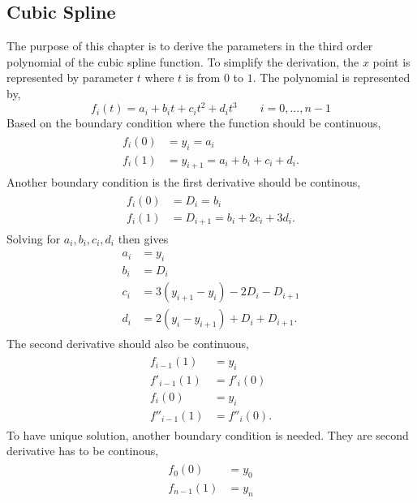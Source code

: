 \begin{appendices}
\chapter{Cubic Spline}
\label{ch:cubicspline}
The purpose of this chapter is to derive the parameters in the third order polynomial of the cubic spline function. To simplify the derivation, the $x$ point is represented by parameter $t$ where $t$ is from $0$ to $1$. The polynomial is represented by,
\begin{equation}
f_{i}(t)=a_i + b_i t +c_i t^2 +d_i t^3 \qquad i=0,...,n-1
\end{equation} 
Based on the boundary condition where the function should be continuous, 
\begin{align}
\begin{split}
f_{i}(0)&=y_i=a_i \\
f_{i}(1)&=y_{i+1}=a_i+b_i+c_i+d_i.
\end{split}
\end{align}
Another boundary condition is the first derivative should be continous,
\begin{align}
\begin{split}
f_{i}(0)&=D_i=b_i \\
f_{i}(1)&=D_{i+1}=b_i+2 c_i+3 d_i.
\end{split}
\end{align}
Solving for $a_i,b_i,c_i,d_i$ then gives
\begin{align}
\begin{split}
a_i&=y_i \\
b_i &= D_i \\
c_i &= 3 (y_{i+1}-y_i) -2 D_i -D_{i+1} \\
d_i &= 2 (y_i-y_{i+1}) +D_i +D_{i+1}. 
\end{split}
\end{align}
The second derivative should also be continuous,
\begin{align}
\begin{split}
f_{i-1}(1)&=y_i \\
f'_{i-1}(1)&=f'_{i}(0) \\
f_{i}(0)&= y_i \\
f''_{i-1}(1)&=f''_{i}(0). 
\end{split}
\end{align}
To have unique solution, another boundary condition is needed. They are second derivative has to be continous,
\begin{align}
\begin{split}
f_{0}(0)&=y_0 \\
f_{n-1}(1)&=y_n 
\end{split}
\end{align}


\end{appendices}
